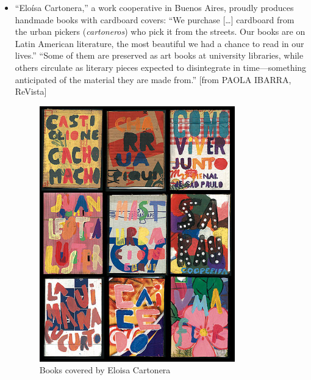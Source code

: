 \documentclass[12pt]{article}
\providecommand{\quotes}[1]{``#1''}
\begin{document}
\begin{itemize}
\item “Eloísa Cartonera,” a work cooperative in Buenos Aires, proudly produces handmade books with cardboard covers: \quotes{We purchase [\ldots] cardboard from the
urban pickers (\textit{cartoneros}) who pick it from the streets. Our books are on Latin American literature, the most beautiful we had a chance to read in our lives.} \quotes{Some of them are preserved as art books at university libraries, while others circulate as literary pieces expected to disintegrate in time---something anticipated of the material they are made from.} [from PAOLA IBARRA, ReVista]
  \begin{figure}[ht]
      \centering
      \includegraphics[width=0.8\textwidth]{graphics/EloisaCartonera_Books.jpg}
      \caption{Books covered by Eloisa Cartonera}
      \label{fig:EloisaCartonera_Books}
  \end{figure}



\end{itemize}
\end{document}
